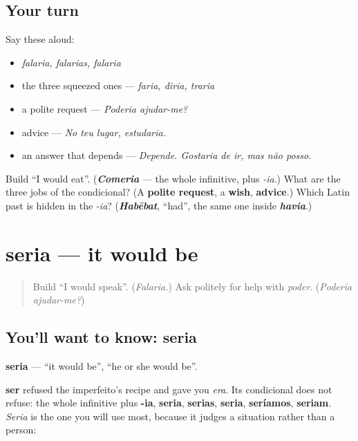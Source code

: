 \subsection*{Your turn}
Say these aloud:

\begin{itemize}
\raggedright
  \item \emph{falaria, falarias, falaria}
  \item the three squeezed ones — \emph{faria, diria, traria}
  \item a polite request — \emph{Poderia ajudar-me?}
  \item advice — \emph{No teu lugar, estudaria.}
  \item an answer that depends — \emph{Depende. Gostaria de ir, mas não posso.}
\end{itemize}

\begin{tcolorbox}[breakable,colback=teal!4,colframe=teal!35!black,title={Before you move on}]
Build \textquotedblleft{}I would eat\textquotedblright{}. (\emph{\textbf{Comeria}} — the whole infinitive, plus \emph{-ia}.) What are the three jobs of the condicional? (A \textbf{polite request}, a \textbf{wish}, \textbf{advice}.) Which Latin past is hidden in the \emph{-ia}? (\emph{\textbf{Habēbat}}, \textquotedblleft{}had\textquotedblright{}, the same one inside \emph{\textbf{havia}}.)
\end{tcolorbox}
\section[seria]{seria — it would be}

\label{lesson:PT-C268-seria}



\begin{quote}
Build \textquotedblleft{}I would speak\textquotedblright{}. (\emph{Falaria.}) Ask politely for help with \emph{poder}. (\emph{Poderia ajudar-me?})
\end{quote}

\subsection*{You'll want to know: seria}
\textbf{seria} — \textquotedblleft{}it would be\textquotedblright{}, \textquotedblleft{}he or she would be\textquotedblright{}.

\textbf{ser} refused the imperfeito's recipe and gave you \emph{era}. Its condicional does not refuse: the whole infinitive plus \textbf{-ia}, \textbf{seria}, \textbf{serias}, \textbf{seria}, \textbf{seríamos}, \textbf{seriam}. \emph{Seria} is the one you will use most, because it judges a situation rather than a person:

